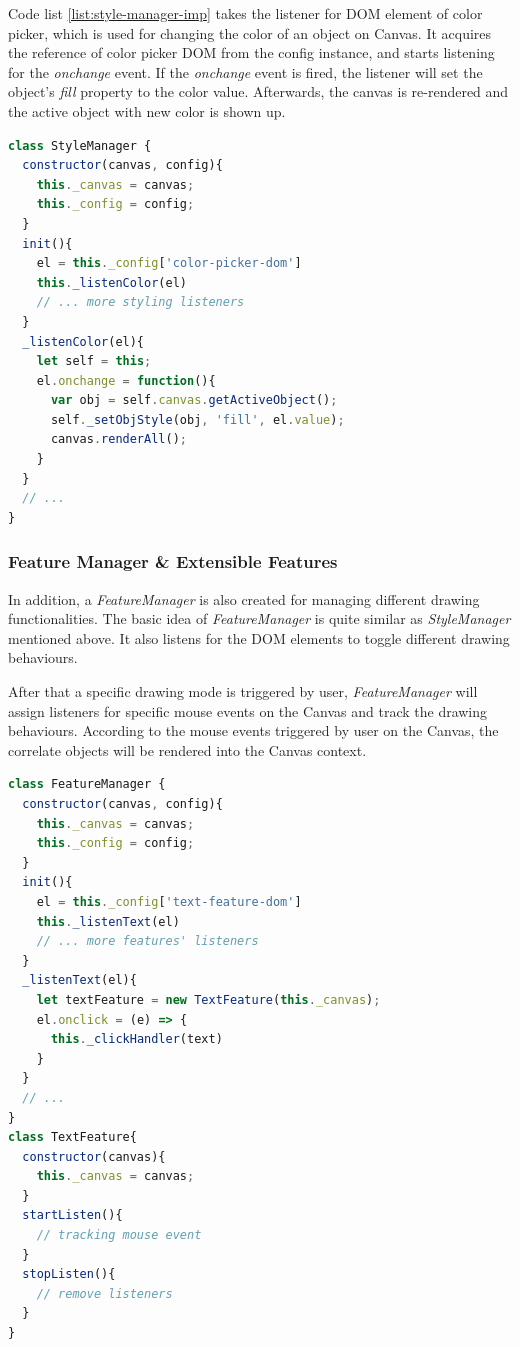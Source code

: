 Code list \ref{list:style-manager-imp} takes the listener for DOM element of color picker, which is used for changing the color of an object on Canvas. It acquires the reference of color picker DOM from the config instance, and starts listening for the \textit{onchange} event. If the \textit{onchange} event is fired, the listener will set the object's \textit{fill} property to the color value. Afterwards, the canvas is re-rendered and the active object with new color is shown up.

\begin{lstlisting}[language=JavaScript, caption=Main process of StyleManager, label={list:style-manager-imp}]
class StyleManager {
  constructor(canvas, config){
    this._canvas = canvas;
    this._config = config;
  }
  init(){
    el = this._config['color-picker-dom']
    this._listenColor(el)
    // ... more styling listeners
  }
  _listenColor(el){
    let self = this;
    el.onchange = function(){
      var obj = self.canvas.getActiveObject();
      self._setObjStyle(obj, 'fill', el.value);
      canvas.renderAll();
    }
  }
  // ...
}
\end{lstlisting}


\subsubsection{Feature Manager \& Extensible Features}

In addition, a \textit{FeatureManager} is also created for managing different drawing functionalities. The basic idea of \textit{FeatureManager} is quite similar as \textit{StyleManager} mentioned above. It also listens for the DOM elements to toggle different drawing behaviours.

After that a specific drawing mode is triggered by user, \textit{FeatureManager} will assign listeners for specific mouse events on the Canvas and track the drawing behaviours. According to the mouse events triggered by user on the Canvas, the correlate objects will be rendered into the Canvas context.

\begin{lstlisting}[language=JavaScript, caption=Main process of FeatureManager, label={list:feature-manager-imp}]
class FeatureManager {
  constructor(canvas, config){
    this._canvas = canvas;
    this._config = config;
  }
  init(){
    el = this._config['text-feature-dom']
    this._listenText(el)
    // ... more features' listeners
  }
  _listenText(el){
    let textFeature = new TextFeature(this._canvas);
    el.onclick = (e) => { 
      this._clickHandler(text)
    }
  }
  // ...
}
class TextFeature{
  constructor(canvas){
    this._canvas = canvas;
  }
  startListen(){
    // tracking mouse event
  }
  stopListen(){
    // remove listeners
  }
}
\end{lstlisting}

